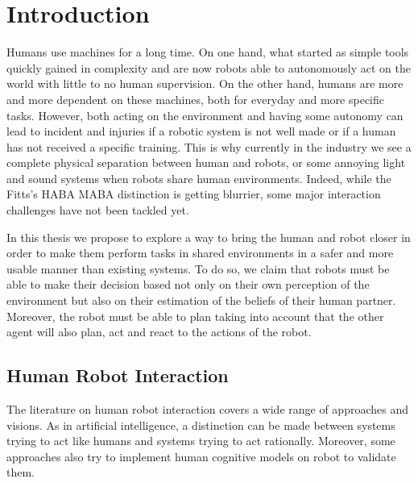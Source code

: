 \documentclass[a4paper,11pt,twoside]{StyleThese}
\begin{document}
\fi


\chapter*{Introduction}
Humans use machines for a long time. On one hand, what started as simple tools quickly gained in complexity and are now robots able to autonomously act on the world with little to no human supervision. On the other hand, humans are more and more dependent on these machines, both for everyday and more specific tasks.
However, both acting on the environment and having some autonomy can lead to incident and injuries if a robotic system is not well made or if a human has not received a specific training. This is why currently in the industry we see a complete physical separation between human and robots, or some annoying light and sound systems when robots share human environments. Indeed, while the Fitts's HABA MABA \cite{fitts_human_1951} distinction is getting blurrier, some major interaction challenges have not been tackled yet.

In this thesis we propose to explore a way to bring the human and robot closer in order to make them perform tasks in shared environments in a safer and more usable manner than existing systems. To do so, we claim that robots must be able to make their decision based not only on their own perception of the environment but also on their estimation of the beliefs of their human partner. Moreover, the robot must be able to plan taking into account that the other agent will also plan, act and react to the actions of the robot.

\section*{Human Robot Interaction}
The literature on human robot interaction covers a wide range of approaches and visions. As in artificial intelligence, a distinction can be made between systems trying to act like humans and systems trying to act rationally. Moreover, some approaches also try to implement human cognitive models on robot to validate them. %
\end{document}
